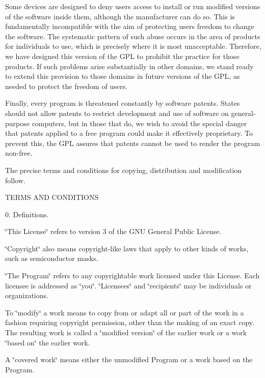 Some devices are designed to deny users access to install or run modified versions of the software inside them, although the manufacturer can do so. This is fundamentally incompatible with the aim of protecting users\textquotesingle{} freedom to change the software. The systematic pattern of such abuse occurs in the area of products for individuals to use, which is precisely where it is most unacceptable. Therefore, we have designed this version of the G\+P\+L to prohibit the practice for those products. If such problems arise substantially in other domains, we stand ready to extend this provision to those domains in future versions of the G\+P\+L, as needed to protect the freedom of users.

Finally, every program is threatened constantly by software patents. States should not allow patents to restrict development and use of software on general-\/purpose computers, but in those that do, we wish to avoid the special danger that patents applied to a free program could make it effectively proprietary. To prevent this, the G\+P\+L assures that patents cannot be used to render the program non-\/free.

The precise terms and conditions for copying, distribution and modification follow. \begin{DoxyVerb}                   TERMS AND CONDITIONS
\end{DoxyVerb}


0. Definitions.

\char`\"{}\+This License\char`\"{} refers to version 3 of the G\+N\+U General Public License.

\char`\"{}\+Copyright\char`\"{} also means copyright-\/like laws that apply to other kinds of works, such as semiconductor masks.

\char`\"{}\+The Program\char`\"{} refers to any copyrightable work licensed under this License. Each licensee is addressed as \char`\"{}you\char`\"{}. \char`\"{}\+Licensees\char`\"{} and \char`\"{}recipients\char`\"{} may be individuals or organizations.

To \char`\"{}modify\char`\"{} a work means to copy from or adapt all or part of the work in a fashion requiring copyright permission, other than the making of an exact copy. The resulting work is called a \char`\"{}modified version\char`\"{} of the earlier work or a work \char`\"{}based on\char`\"{} the earlier work.

A \char`\"{}covered work\char`\"{} means either the unmodified Program or a work based on the Program.

